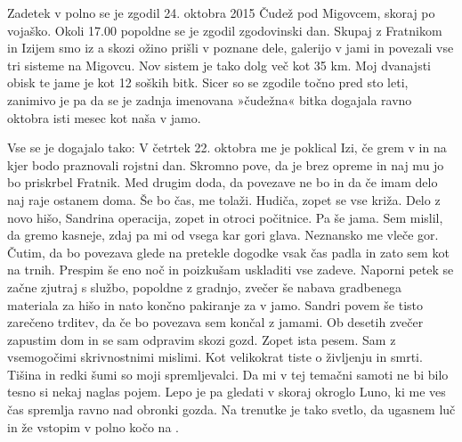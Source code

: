\begin{marginfigure}
\end{marginfigure}
Zadetek v polno se je zgodil 24. oktobra 2015 Čudež pod Migovcem, skoraj po vojaško. Okoli 17.00 popoldne se je zgodil zgodovinski dan. Skupaj z Fratnikom in Izijem smo iz a skozi ožino prišli v poznane dele, galerijo v jami  in povezali vse tri sisteme na Migovcu. Nov sistem je tako dolg več kot 35 km. Moj dvanajsti obisk te jame je kot 12 soških bitk. Sicer so se zgodile točno pred sto leti, zanimivo je pa da se je zadnja imenovana »čudežna« bitka dogajala ravno oktobra isti mesec kot naša v jamo. 

  Vse se je dogajalo tako: V četrtek 22. oktobra me je poklical Izi, če grem v  in na  kjer bodo praznovali rojstni dan. Skromno pove, da je brez opreme in naj mu jo bo priskrbel Fratnik. Med drugim doda, da povezave ne bo in da če imam delo naj raje ostanem doma. Še bo čas, me tolaži. Hudiča, zopet se vse križa. Delo z novo hišo, Sandrina operacija, zopet in otroci počitnice. Pa še jama. Sem mislil, da gremo kasneje, zdaj pa mi od vsega kar gori glava. Neznansko me vleče gor. Čutim, da bo povezava glede na pretekle dogodke vsak čas padla in zato sem kot na trnih. Prespim še eno noč in poizkušam uskladiti vse zadeve. Naporni petek se začne zjutraj s službo, popoldne z gradnjo, zvečer še nabava gradbenega materiala za hišo in nato končno pakiranje za v jamo. Sandri povem še tisto zarečeno trditev, da če bo povezava sem končal z jamami.  Ob desetih zvečer zapustim dom in se sam odpravim skozi gozd. Zopet ista pesem. Sam z vsemogočimi skrivnostnimi mislimi. Kot velikokrat tiste o življenju in smrti. Tišina in redki šumi so moji spremljevalci. Da mi v tej temačni samoti ne bi bilo tesno si nekaj naglas pojem. Lepo je pa gledati v skoraj okroglo Luno, ki me ves čas spremlja ravno nad obronki gozda. Na trenutke je tako svetlo, da ugasnem luč in že vstopim v polno kočo na . 

